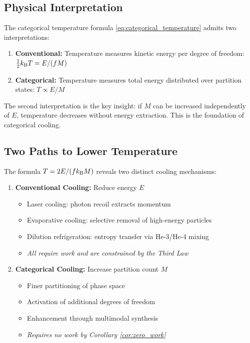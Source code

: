 \subsection{Physical Interpretation}

The categorical temperature formula \eqref{eq:categorical_temperature} admits two interpretations:

\begin{enumerate}
    \item \textbf{Conventional:} Temperature measures kinetic energy per degree of freedom: $\frac{1}{2}k_{\mathrm{B}} T = E/(fM)$

    \item \textbf{Categorical:} Temperature measures total energy distributed over partition states: $T \propto E/M$
\end{enumerate}

The second interpretation is the key insight: if $M$ can be increased independently of $E$, temperature decreases without energy extraction. This is the foundation of categorical cooling.

\subsection{Two Paths to Lower Temperature}

The formula $T = 2E/(fk_{\mathrm{B}} M)$ reveals two distinct cooling mechanisms:

\begin{enumerate}
    \item \textbf{Conventional Cooling:} Reduce energy $E$
    \begin{itemize}
        \item Laser cooling: photon recoil extracts momentum
        \item Evaporative cooling: selective removal of high-energy particles
        \item Dilution refrigeration: entropy transfer via He-3/He-4 mixing
        \item \textit{All require work and are constrained by the Third Law}
    \end{itemize}

    \item \textbf{Categorical Cooling:} Increase partition count $M$
    \begin{itemize}
        \item Finer partitioning of phase space
        \item Activation of additional degrees of freedom
        \item Enhancement through multimodal synthesis
        \item \textit{Requires no work by Corollary \ref{cor:zero_work}}
    \end{itemize}
\end{enumerate}


